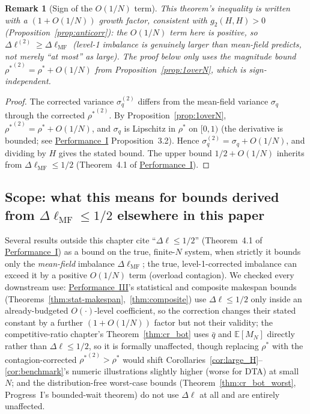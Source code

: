 \documentclass[11pt,a4paper]{article}
\newtheorem{remark}{Remark}[section]
\newcommand{\rhostar}{\rho^{*}}
\newcommand{\gtwo}{g_2}
\begin{document}
\begin{remark}[Sign of the $O(1/N)$ term]
This theorem's inequality is written with a $(1+O(1/N))$ \emph{growth}
factor, consistent with $\gtwo(H,H)>0$ (Proposition~\ref{prop:anticorr}):
the $O(1/N)$ term here is \emph{positive}, so
$\Delta\ell^{(2)} \geq \Delta\ell_{\mathrm{MF}}$ (level-1 imbalance is
genuinely larger than mean-field predicts, not merely ``at most'' as
large). The proof below only uses the \emph{magnitude} bound
${\rhostar}^{(2)} = \rhostar + O(1/N)$ from Proposition~\ref{prop:1overN},
which is sign-independent.
\end{remark}

\begin{proof}
The corrected variance $\sigma_q^{(2)}$ differs from the mean-field
variance $\sigma_q$ through the corrected ${\rhostar}^{(2)}$.
By Proposition~\ref{prop:1overN}, ${\rhostar}^{(2)} = \rhostar + O(1/N)$,
and $\sigma_q$ is Lipschitz in $\rhostar$ on $[0,1)$ (the derivative
is bounded; see \hyperref[chap:load_balance]{Performance~I} Proposition~3.2).
Hence $\sigma_q^{(2)} = \sigma_q + O(1/N)$,
and dividing by $H$ gives the stated bound.
The upper bound $1/2 + O(1/N)$ inherits from $\Delta\ell_{\mathrm{MF}} \leq 1/2$
(Theorem~4.1 of \hyperref[chap:load_balance]{Performance~I}).
\end{proof}

\subsection{Scope: what this means for bounds derived from $\Delta\ell_{\mathrm{MF}} \leq 1/2$ elsewhere in this paper}
\label{sec:contagion-scope}

Several results outside this chapter cite ``$\Delta\ell \leq 1/2$''
(Theorem~4.1 of \hyperref[chap:load_balance]{Performance~I}) as a bound
on the true, finite-$N$ system, when strictly it bounds only the
\emph{mean-field} imbalance $\Delta\ell_{\mathrm{MF}}$; the true,
level-1-corrected imbalance can exceed it by a positive $O(1/N)$ term
(overload contagion). We checked every downstream use:
\hyperref[chap:makespan]{Performance~III}'s statistical and composite
makespan bounds (Theorems~\ref{thm:stat-makespan},~\ref{thm:composite})
use $\Delta\ell \leq 1/2$ only inside an already-budgeted
$O(\cdot)$-level coefficient, so the correction changes their stated
constant by a further $(1+O(1/N))$ factor but not their validity; the
competitive-ratio chapter's Theorem~\ref{thm:cr_bot} uses $\bar q$ and
$\mathbb{E}[M_N]$ directly rather than $\Delta\ell \leq 1/2$, so it is
formally unaffected, though replacing $\rhostar$ with the
contagion-corrected ${\rhostar}^{(2)}>\rhostar$ would shift
Corollaries~\ref{cor:large_H}--\ref{cor:benchmark}'s numeric
illustrations slightly higher (worse for DTA) at small $N$; and the
distribution-free worst-case bounds
(Theorem~\ref{thm:cr_bot_worst}, Progress~I's bounded-wait theorem) do
not use $\Delta\ell$ at all and are entirely unaffected.
\end{document}
